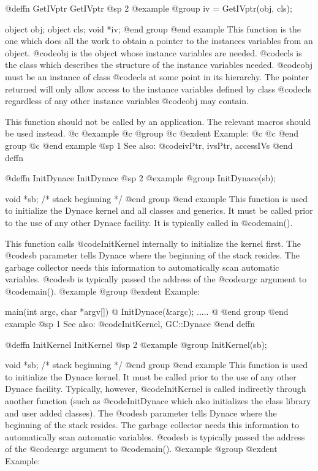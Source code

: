 {{{{@deffn {GetIVptr} GetIVptr
@sp 2
@example
@group
iv = GetIVptr(obj, cls);

object  obj;
object  cls;
void    *iv;
@end group
@end example
This function is the one which does all the work to obtain
a pointer to the instances variables from an object.  @code{obj}
is the object whose instance variables are needed.  @code{cls}
is the class which describes the structure of the instance
variables needed.  @code{obj} must be an instance of class @code{cls}
at some point in its hierarchy.  The pointer returned will only allow
access to the instance variables defined by class @code{cls} regardless
of any other instance variables @code{obj} may contain.

This function should not be called by an application.  The relevant
macros should be used instead.
@c @example
@c @group
@c @exdent Example:
@c 
@c @end group
@c @end example
@sp 1
See also:  @code{ivPtr, ivsPtr, accessIVs}
@end deffn







@deffn {InitDynace} InitDynace
@sp 2
@example
@group
InitDynace(sb);

void    *sb;  /*  stack beginning  */
@end group
@end example
This function is used to initialize the Dynace kernel and all classes
and generics.  It must be called prior to the use of any other Dynace
facility.  It is typically called in @code{main()}.

This function calls @code{InitKernel} internally to initialize the
kernel first.  The @code{sb} parameter tells Dynace where the beginning
of the stack resides.  The garbage collector needs this information to
automatically scan automatic variables.  @code{sb} is typically passed
the address of the @code{argc} argument to @code{main()}.
@example
@group
@exdent Example:

main(int argc, char *argv[])
@{
        InitDynace(&argc);
        .....
@}
@end group
@end example
@sp 1
See also:  @code{InitKernel, GC::Dynace}
@end deffn






@deffn {InitKernel} InitKernel
@sp 2
@example
@group
InitKernel(sb);

void    *sb;  /*  stack beginning  */
@end group
@end example
This function is used to initialize the Dynace kernel.  It must be
called prior to the use of any other Dynace facility.  Typically,
however, @code{InitKernel} is called indirectly through another function
(such as @code{InitDynace} which also initializes the class library and
user added classes).  The @code{sb} parameter tells Dynace where the
beginning of the stack resides.  The garbage collector needs this
information to automatically scan automatic variables.  @code{sb} is
typically passed the address of the @code{argc} argument to
@code{main()}.
@example
@group
@exdent Example:

}}}}
